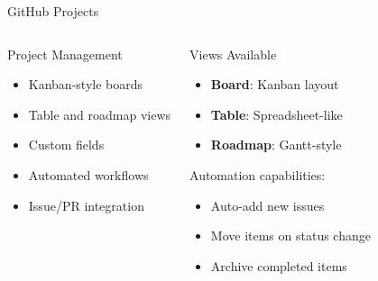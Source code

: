 \documentclass[aspectratio=169]{beamer}
\begin{document}
	\begin{frame}{GitHub Projects}
		\begin{columns}
			\begin{block}{Project Management}
				\begin{itemize}
					\item Kanban-style boards
					\item Table and roadmap views
					\item Custom fields
					\item Automated workflows
					\item Issue/PR integration
				\end{itemize}
			\end{block}
			
			\begin{block}{Views Available}
				\begin{itemize}
					\item \textbf{Board}: Kanban layout
					\item \textbf{Table}: Spreadsheet-like
					\item \textbf{Roadmap}: Gantt-style
				\end{itemize}
				\vspace{0.3cm}
				Automation capabilities:
				\begin{itemize}
					\item Auto-add new issues
					\item Move items on status change
					\item Archive completed items
				\end{itemize}
			\end{block}
		\end{columns}
	\end{frame}
	
\end{document}

